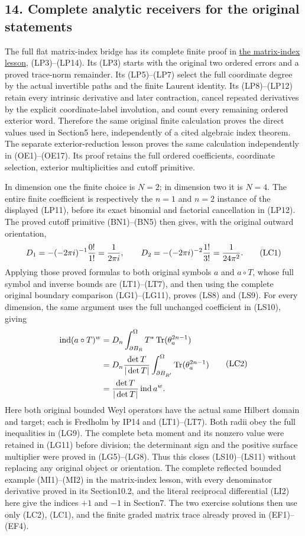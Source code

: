 \documentclass[
  11pt,
]{article}
\begin{document}
\subsection{14. Complete analytic receivers for the original
statements}\label{complete-analytic-receivers-for-the-original-statements}

The full flat matrix-index bridge has its complete finite proof in
\href{matrix-weyl-index-theorem.pdf}{the matrix-index lesson},
(LP3)--(LP14). Its (LP3) starts with the original two ordered errors and
a proved trace-norm remainder. Its (LP5)--(LP7) select the full
coordinate degree by the actual invertible paths and the finite Laurent
identity. Its (LP8)--(LP12) retain every intrinsic derivative and later
contraction, cancel repeated derivatives by the explicit
coordinate-label involution, and count every remaining ordered exterior
word. Therefore the same original finite calculation proves the direct
values used in Section5 here, independently of a cited algebraic index
theorem. The separate exterior-reduction lesson proves the same
calculation independently in (OE1)--(OE17). Its proof retains the full
ordered coefficients, coordinate selection, exterior multiplicities and
cutoff primitive.

In dimension one the finite choice is \(N=2\); in dimension two it is
\(N=4\). The entire finite coefficient is respectively the \(n=1\) and
\(n=2\) instance of the displayed (LP11), before its exact binomial and
factorial cancellation in (LP12). The proved cutoff primitive
(BN1)--(BN5) then gives, with the original outward orientation, \[
 D_1=-(-2\pi i)^{-1}{0!\over1!}={1\over2\pi i},\qquad
 D_2=-(-2\pi i)^{-2}{1!\over3!}={1\over24\pi^2}.
 \tag{LC1}
\] Applying those proved formulas to both original symbols \(a\) and
\(a\circ T\), whose full symbol and inverse bounds are (LT1)--(LT7), and
then using the complete original boundary comparison (LG1)--(LG11),
proves (LS8) and (LS9). For every dimension, the same argument uses the
full unchanged coefficient in (LS10), giving \[
\begin{aligned}
 \operatorname{ind}(a\circ T)^w
 &=D_n\int_{\partial B_R}^{\Omega}T^*\operatorname{Tr}(\theta_a^{2n-1})\\
 &=D_n{\det T\over|\det T|}
      \int_{\partial B_{R'}}^{\Omega}\operatorname{Tr}(\theta_a^{2n-1})\\
 &={\det T\over|\det T|}\operatorname{ind}a^w.
\end{aligned}
 \tag{LC2}
\] Here both original bounded Weyl operators have the actual same
Hilbert domain and target; each is Fredholm by IP14 and (LT1)--(LT7).
Both radii obey the full inequalities in (LG9). The complete beta moment
and its nonzero value were retained in (LG11) before division; the
determinant sign and the positive surface multiplier were proved in
(LG5)--(LG8). Thus this closes (LS10)--(LS11) without replacing any
original object or orientation. The complete reflected bounded example
(MI1)--(MI2) in the matrix-index lesson, with every denominator
derivative proved in its Section10.2, and the literal reciprocal
differential (LI2) here give the indices \(+1\) and \(-1\) in Section7.
The two exercise solutions then use only (LC2), (LC1), and the finite
graded matrix trace already proved in (EF1)--(EF4).
\end{document}
